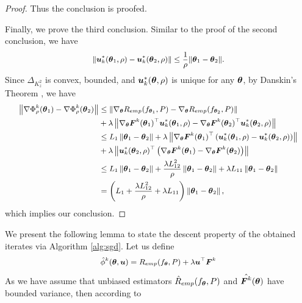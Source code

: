 \begin{proof}
	Thus the conclusion is proofed. 
	\par
	Finally, we prove the third conclusion. Similar to the proof of the second conclusion, we have 
	\begin{equation}
		\small
		\left\|\bu^{*}_{k}(\btheta_{1}, \rho) - \bu^{*}_{k}(\btheta_{2}, \rho)\right\| \leq \frac{1}{\rho}\|\btheta_{1} - \btheta_{2}\|. 
	\end{equation}
	Since $\Delta_{K_{z}^{2}}$ is convex, bounded, and $\boldsymbol{u}^{*}_{k}(\text{\boldmath{$\theta$}}, \rho)$ is unique for any $\text{\boldmath{$\theta$}}$, by Danskin's Theorem \citep{bernhard1995theorem}, we have 
	\begin{equation}
		\small
		\begin{aligned}
			\left\|\nabla\Phi_{\rho}^{k}(\btheta_{1}) - \nabla\Phi_{\rho}^{k}(\btheta_{2})\right\|
			& \leq \left\|\nabla_{\btheta}R_{emp}(f_{\btheta_{1}}, P) - \nabla_{\btheta}R_{emp}(f_{\btheta_{2}}, P) \right\| \\
			& + \lambda\left\|\nabla_{\btheta}\bF^{k}(\btheta_{1})^{\top}\bu^{*}_{k}(\btheta_{1}, \rho) - \nabla_{\btheta}\bF^{k}(\btheta_{2})^{\top}\bu^{*}_{k}(\btheta_{2}, \rho)\right\| \\
			& \leq L_{1}\left\|\btheta_{1} - \btheta_{2}\right\| + \lambda\left\|\nabla_{\btheta}\bF^{k}(\btheta_{1})^{\top}\left(\bu^{*}_{k}(\btheta_{1}, \rho) - \bu^{*}_{k}(\btheta_{2}, \rho)\right)\right\| \\
			& + \lambda\left\|\bu^{*}_{k}(\btheta_{2}, \rho)^{\top}\left(\nabla_{\btheta}\bF^{k}(\btheta_{1}) - \nabla_{\btheta}\bF^{k}(\btheta_{2})\right)\right\| \\
			& \leq L_{1}\left\|\btheta_{1} - \btheta_{2}\right\| + \frac{\lambda L_{12}^{2}}{\rho}\left\|\btheta_{1} - \btheta_{2}\right\| + \lambda L_{11}\left\|\btheta_{1} - \btheta_{2}\right\| \\
			& = \left(L_{1} + \frac{\lambda L_{12}^{2}}{\rho} + \lambda L_{11}\right)\left\|\btheta_{1} - \btheta_{2}\right\|,
		\end{aligned}
	\end{equation}
	which implies our conclusion.   
\end{proof}
\par
We present the following lemma to state the descent property of the obtained iterates via Algorithm \ref{alg:sgd}. Let us define 
\begin{equation}
	\small
	\hat{\phi}^{k}(\btheta, \bu) = R_{emp}(f_{\btheta}, P) + \lambda\bu^{\top}\bF^{k}
\end{equation}
As we have assume that unbiased estimators $\hat{R}_{emp}(f_{\text{\boldmath{$\theta$}}}, P)$ and $\hat{\boldsymbol{F}^{k}}(\text{\boldmath{$\theta$}})$ have bounded variance, then according to 
